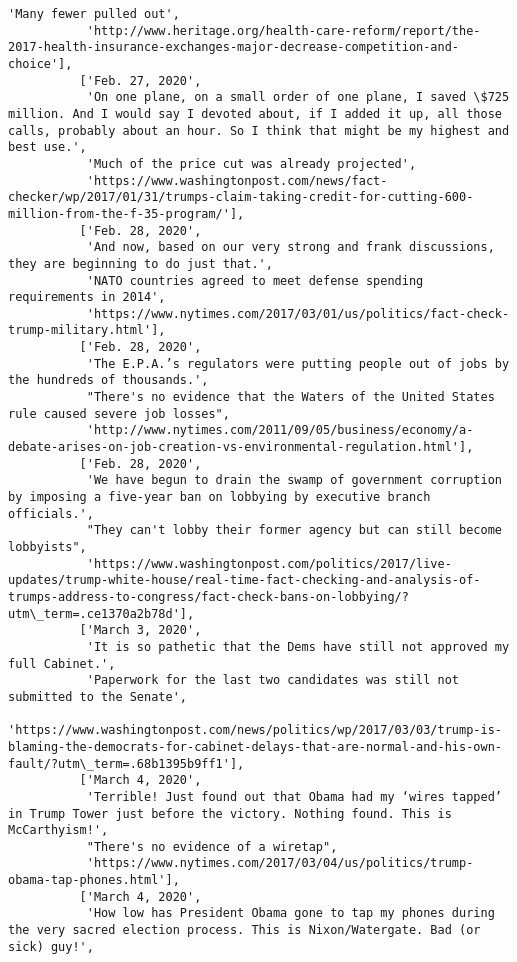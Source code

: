 \documentclass[11pt]{article}
\begin{document}
\begin{Verbatim}[commandchars=\\\{\}]
           'Many fewer pulled out',
           'http://www.heritage.org/health-care-reform/report/the-2017-health-insurance-exchanges-major-decrease-competition-and-choice'],
          ['Feb. 27, 2020',
           'On one plane, on a small order of one plane, I saved \$725 million. And I would say I devoted about, if I added it up, all those calls, probably about an hour. So I think that might be my highest and best use.',
           'Much of the price cut was already projected',
           'https://www.washingtonpost.com/news/fact-checker/wp/2017/01/31/trumps-claim-taking-credit-for-cutting-600-million-from-the-f-35-program/'],
          ['Feb. 28, 2020',
           'And now, based on our very strong and frank discussions, they are beginning to do just that.',
           'NATO countries agreed to meet defense spending requirements in 2014',
           'https://www.nytimes.com/2017/03/01/us/politics/fact-check-trump-military.html'],
          ['Feb. 28, 2020',
           'The E.P.A.’s regulators were putting people out of jobs by the hundreds of thousands.',
           "There's no evidence that the Waters of the United States rule caused severe job losses",
           'http://www.nytimes.com/2011/09/05/business/economy/a-debate-arises-on-job-creation-vs-environmental-regulation.html'],
          ['Feb. 28, 2020',
           'We have begun to drain the swamp of government corruption by imposing a five-year ban on lobbying by executive branch officials.',
           "They can't lobby their former agency but can still become lobbyists",
           'https://www.washingtonpost.com/politics/2017/live-updates/trump-white-house/real-time-fact-checking-and-analysis-of-trumps-address-to-congress/fact-check-bans-on-lobbying/?utm\_term=.ce1370a2b78d'],
          ['March 3, 2020',
           'It is so pathetic that the Dems have still not approved my full Cabinet.',
           'Paperwork for the last two candidates was still not submitted to the Senate',
           'https://www.washingtonpost.com/news/politics/wp/2017/03/03/trump-is-blaming-the-democrats-for-cabinet-delays-that-are-normal-and-his-own-fault/?utm\_term=.68b1395b9ff1'],
          ['March 4, 2020',
           'Terrible! Just found out that Obama had my ‘wires tapped’ in Trump Tower just before the victory. Nothing found. This is McCarthyism!',
           "There's no evidence of a wiretap",
           'https://www.nytimes.com/2017/03/04/us/politics/trump-obama-tap-phones.html'],
          ['March 4, 2020',
           'How low has President Obama gone to tap my phones during the very sacred election process. This is Nixon/Watergate. Bad (or sick) guy!',

\end{Verbatim}
\end{document}

